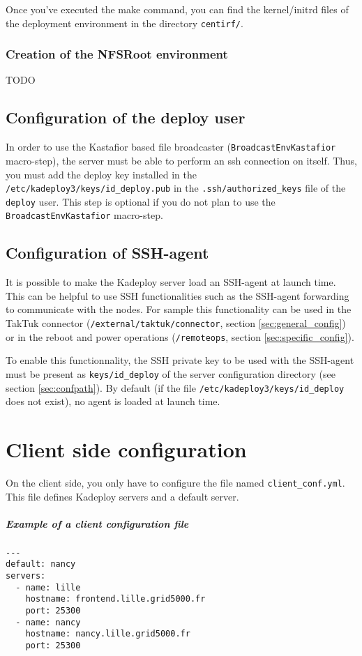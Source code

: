 \documentclass[a4wide,10pt,oneside]{book}
\newcommand{\ypath}[1]{\texttt{#1}}
\begin{document}
Once you've executed the make command, you can find the kernel/initrd files of the deployment environment in the directory \texttt{centirf/}.

\subsection{Creation of the NFSRoot environment}
TODO

\section{Configuration of the deploy user}
In order to use the Kastafior based file broadcaster (\texttt{BroadcastEnvKastafior} macro-step), the server must be able to perform an ssh connection on itself. Thus, you must add the deploy key installed in the \texttt{/etc/kadeploy3/keys/id\_deploy.pub} in the \texttt{.ssh/authorized\_keys} file of the \texttt{deploy} user. This step is optional if you do not plan to use the \texttt{BroadcastEnvKastafior} macro-step.

\section{Configuration of SSH-agent}
It is possible to make the Kadeploy server load an SSH-agent at launch time. This can be helpful to use SSH functionalities such as the SSH-agent forwarding to communicate with the nodes. For sample this functionality can be used in the TakTuk connector (\ypath{/external/taktuk/connector}, section \ref{sec:general_config}) or in the reboot and power operations (\ypath{/remoteops}, section \ref{sec:specific_config}).

To enable this functionnality, the SSH private key to be used with the SSH-agent must be present as \texttt{keys/id\_deploy} of the server configuration directory (see section \ref{sec:confpath}). By default (if the file \texttt{/etc/kadeploy3/keys/id\_deploy} does not exist), no agent is loaded at launch time.

\chapter{Client side configuration}\label{chap:Client_side_conf}
On the client side, you only have to configure the file named \texttt{client\_conf.yml}. This file defines Kadeploy servers and a default server.

\paragraph{Example of a client configuration file}
\begin{verbatim}
---
default: nancy
servers:
  - name: lille
    hostname: frontend.lille.grid5000.fr
    port: 25300
  - name: nancy
    hostname: nancy.lille.grid5000.fr
    port: 25300
\end{verbatim}
\end{document}
